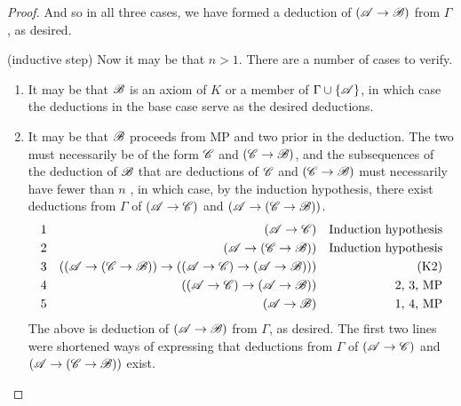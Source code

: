 \begin{proposition}
\begin{proof}
    And so in all three cases, we have formed a deduction of \((\mathscr{A} \rightarrow \mathscr{B})\) from \(\Gamma\), as desired.

    (inductive step) Now it may be that \(n > 1\). There are a number of cases to verify.
    \begin{enumerate}
      \item It may be that \(\mathscr{B}\) is an axiom of \(K\) or a member of \(\Gamma \cup \{\mathscr{A}\}\), in which case the deductions in the base case serve as the desired deductions.

      \item It may be that \(\mathscr{B}\) proceeds from MP and two prior \wfs{} in the deduction. The two \wfs{} must necessarily be of the form \(\mathscr{C}\) and \((\mathscr{C} \rightarrow \mathscr{B})\), and the subsequences of the deduction of \(\mathscr{B}\) that are deductions of \(\mathscr{C}\) and \((\mathscr{C} \rightarrow \mathscr{B})\) must necessarily have fewer than \(n\) \wfs{}, in which case, by the induction hypothesis, there exist deductions from \(\Gamma\) of \((\mathscr{A} \rightarrow \mathscr{C})\) and \((\mathscr{A} \rightarrow (\mathscr{C} \rightarrow \mathscr{B}))\).
        \begin{align*}
          \text{1}&&
          (\mathscr{A} \rightarrow \mathscr{C})&&
          \text{Induction hypothesis}\\
          \text{2}&&
          (\mathscr{A} \rightarrow (\mathscr{C} \rightarrow \mathscr{B}))&&
          \text{Induction hypothesis}\\
          \text{3}&&
          ((\mathscr{A} \rightarrow (\mathscr{C} \rightarrow \mathscr{B})) \rightarrow ((\mathscr{A} \rightarrow \mathscr{C}) \rightarrow (\mathscr{A} \rightarrow \mathscr{B})))&&
          \text{(K2)}\\
          \text{4}&&
          ((\mathscr{A} \rightarrow \mathscr{C}) \rightarrow (\mathscr{A} \rightarrow \mathscr{B}))&&
          \text{2, 3, MP}\\
          \text{5}&&
          (\mathscr{A} \rightarrow \mathscr{B})&&
          \text{1, 4, MP}
        \end{align*}
        The above is deduction of \((\mathscr{A} \rightarrow \mathscr{B})\) from \(\Gamma\), as desired. The first two lines were shortened ways of expressing that deductions from \(\Gamma\) of \((\mathscr{A} \rightarrow \mathscr{C})\) and \((\mathscr{A} \rightarrow (\mathscr{C} \rightarrow \mathscr{B}))\) exist.


\end{enumerate}
\end{proof}
\end{proposition}
